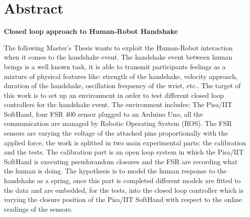 
\chapter*{Abstract}
\begin{center}

\textbf{Closed loop approach to Human-Robot Handshake}
\end{center}
\vspace{60px}
The following Master's Thesis wants to exploit the Human-Robot interaction when it comes to the handshake event. The handshake event between human beings is a well known task, it is able to transmit participants feelings as a mixture of physical features like: strength of the handshake, velocity approach, duration of the handshake, oscillation frequency of the wrist, etc..
The target of this work is to set up an environment in order to test different closed loop controllers for the handshake event.
The environment includes: The Pisa/IIT SoftHand, four FSR 400 sensor plugged to an Arduino Uno, all the communication are managed by Robotic Operating System (ROS).
The FSR sensors are varying the voltage of the attached pins proportionally with the applied force, the work is splitted in two main experimental parts: the calibration and the tests. The calibration part is an open loop system in which the Pisa/IIT SoftHand is executing pseudorandom closures and the FSR are recording what the human is doing. The hypothesis is to model the human response to the handshake as a spring, once this part is completed different models are fitted to the data and are embedded, for the tests, into the closed loop controller which is varying the closure position of the Pisa/IIT SoftHand with respect to the online readings of the sensors. 
\\

